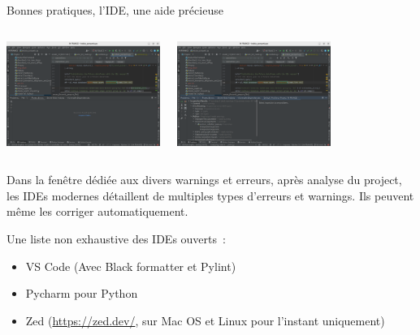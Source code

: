 \documentclass{beamer}
\begin{document}
    \begin{frame}{Bonnes pratiques, l'IDE, une aide précieuse}
        \begin{columns}
            \begin{center}
                \includegraphics[width=5cm]{image/Pycharm-before-analysis}
            \end{center}
            \begin{center}
                \includegraphics[width=5cm]{image/Pycharm-after-analysis}
            \end{center}
        \end{columns}
        \bigbreak

        \begin{flushleft}
            Dans la fenêtre dédiée aux divers warnings et erreurs, après analyse du project, les IDEs modernes détaillent de multiples types d'erreurs et warnings.
            Ils peuvent même les corriger automatiquement.

            Une liste non exhaustive des IDEs ouverts~:
            \begin{itemize}
                \item VS Code (Avec Black formatter et Pylint)
                \item Pycharm pour Python
                \item Zed (\url{https://zed.dev/}, sur Mac OS et Linux pour l'instant uniquement)
            \end{itemize}
        \end{flushleft}

    \end{frame}
\end{document}
